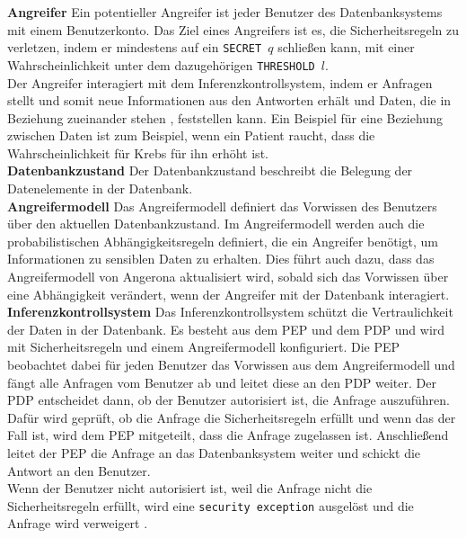 \documentclass[german,version-2020-11]{uzl-thesis}
\begin{document}
\textbf{Angreifer} Ein potentieller Angreifer ist jeder Benutzer des Datenbanksystems mit einem Benutzerkonto. Das Ziel eines Angreifers ist es, die Sicherheitsregeln zu verletzen, indem er mindestens auf ein \texttt{SECRET $q$} schließen kann, mit einer Wahrscheinlichkeit unter dem dazugehörigen \texttt{THRESHOLD $l$}. \\ Der Angreifer interagiert mit dem Inferenzkontrollsystem, indem er Anfragen stellt und somit neue Informationen aus den Antworten erhält und Daten, die in Beziehung zueinander stehen , feststellen kann. Ein Beispiel für eine Beziehung zwischen Daten ist zum Beispiel, wenn ein Patient raucht, dass die Wahrscheinlichkeit für Krebs für ihn erhöht ist.  \\
\textbf{Datenbankzustand} Der Datenbankzustand beschreibt die Belegung der Datenelemente in der Datenbank. \\
\textbf{Angreifermodell} Das Angreifermodell definiert das Vorwissen des Benutzers über den aktuellen Datenbankzustand. Im Angreifermodell werden auch die probabilistischen Abhängigkeitsregeln definiert, die ein Angreifer benötigt, um Informationen zu sensiblen Daten zu erhalten. Dies führt auch dazu, dass das Angreifermodell von Angerona aktualisiert wird, sobald sich das Vorwissen über eine Abhängigkeit verändert, wenn der Angreifer mit der Datenbank interagiert.\\ 
\textbf{Inferenzkontrollsystem} Das Inferenzkontrollsystem schützt die Vertraulichkeit der Daten in der Datenbank. Es besteht aus dem PEP und dem PDP und wird mit Sicherheitsregeln und einem Angreifermodell konfiguriert. Die PEP beobachtet dabei für jeden Benutzer das Vorwissen aus dem Angreifermodell und fängt alle Anfragen vom Benutzer ab und leitet diese an den PDP weiter. Der PDP entscheidet dann, ob der Benutzer autorisiert ist, die Anfrage auszuführen. Dafür wird geprüft, ob die Anfrage die Sicherheitsregeln erfüllt und wenn das der Fall ist, wird dem PEP mitgeteilt, dass die Anfrage zugelassen ist. Anschließend leitet der PEP die Anfrage an das Datenbanksystem weiter und schickt die Antwort an den Benutzer. \\  Wenn der Benutzer nicht autorisiert ist, weil die Anfrage nicht die Sicherheitsregeln erfüllt, wird eine \texttt{security exception} ausgelöst und die Anfrage wird verweigert \cite{guarnieri2017securing}.
\end{document}
